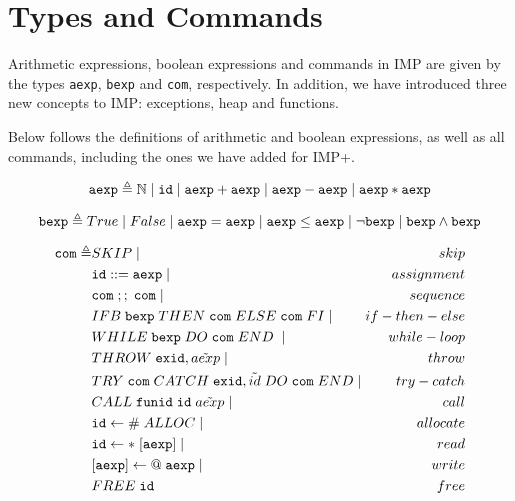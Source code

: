 \section{Types and Commands}

Arithmetic expressions, boolean expressions and commands in IMP are given by the types \verb|aexp|, \verb|bexp| and \verb|com|, respectively. In addition, we have introduced three new concepts to IMP: exceptions, heap and functions.

Below follows the definitions of arithmetic and boolean expressions, as well as all commands, including the ones we have added for IMP+.

\begin{equation}
\verb|aexp| \triangleq \mathbb{N} \;|\; \verb|id| \;|\; \verb|aexp| + \verb|aexp| \;|\;  \verb|aexp| - \verb|aexp| \;|\;  \verb|aexp| * \verb|aexp|
\end{equation}

\begin{equation}
\verb|bexp| \triangleq True \;|\; False \;|\; \verb|aexp| = \verb|aexp| \;|\; \verb|aexp| \leq \verb|aexp| \;|\; \neg\verb|bexp| \;|\; \verb|bexp| \wedge \verb|bexp|
\end{equation}

\begin{equation}
\begin{alignedat}{2}
\verb|com| \triangleq & SKIP \;|\; & skip \\&
	\verb|id| ::= \verb|aexp| \;|\; & assignment \\&
	\verb|com|\; ;;\; \verb|com| \;|\; & sequence \\&
	IFB\; \verb|bexp|\; THEN\; \verb|com|\; ELSE\; \verb|com|\; FI \;|\; & if-then-else \\&
	WHILE\; \verb|bexp|\; DO\; \verb|com|\; END\; \;|\; & while-loop \\&
	THROW\; \verb|exid|, \tilde{aexp} \;|\; & throw \\&
	TRY\; \verb|com|\; CATCH\; \verb|exid|, \tilde{id}\; DO\; \verb|com|\; END \;|\; & try-catch \\&
	CALL\; \verb|funid|\; \verb|id|\; \tilde{aexp} \;|\; & call \\&
	\verb|id|\leftarrow\#\;ALLOC \;|\; & allocate \\&
	\verb|id|\leftarrow*\;[\verb|aexp|] \;|\; & read \\&
	[\verb|aexp|]\leftarrow@\;\verb|aexp| \;|\; & write \\&
	FREE\;\verb|id| & free
\end{alignedat}
\end{equation}

